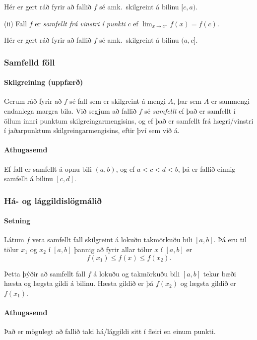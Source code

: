 \documentclass[icelandic,a4paper,12pt]{article}
\begin{document}
Hér er gert ráð fyrir að fallið $f$ sé amk.~skilgreint á bilinu
  $[c, a)$.

\pause
\medskip

\noindent
(ii)  Fall $f$ er {\em samfellt frá vinstri í punkti} $c$ ef
  $\lim_{x\rightarrow c^-}f(x)=f(c)$.
  
  Hér er gert ráð fyrir að fallið $f$ sé amk.~skilgreint á bilinu
  $(a, c]$.

 

\subsubsection*{Samfelld föll}
 \paragraph{Skilgreining (uppfærð)}
 Gerum ráð fyrir að $f$ sé fall sem er skilgreint á
 mengi $A$, þar sem $A$ er sammengi endanlega margra bila.
 Við segjum að fallið $f$ sé \emph{samfellt} ef það er samfellt í 
 öllum innri punktum skilgreingarmengisins, og ef það er samfellt
 frá hægri/vinstri í jaðarpunktum skilgreingarmengisins,
 eftir því sem við á.

\pause
\paragraph{Athugasemd}
	Ef fall er samfellt á opnu bili $(a,b)$, og ef 
	$a<c<d<b$, þá er fallið einnig samfellt á bilinu 
	$[c,d]$.
 


\subsubsection*{Há- og lággildislögmálið}
 \paragraph{Setning}
 Látum $f$ vera samfellt fall skilgreint á lokuðu takmörkuðu bili
  $[a,b]$.  Þá eru til tölur $x_1$ og $x_2$ í $[a,b]$ þannig að 
fyrir allar tölur $x$ í $[a,b]$ er
$$f(x_1)\leq f(x)\leq f(x_2).$$

\pause

Þetta þýðir að samfellt fall $f$ á lokuðu og takmörkuðu
bili $[a,b]$ tekur bæði hæsta og lægsta gildi á bilinu. \pause
Hæsta
gildið er þá $f(x_2)$ og lægsta gildið er $f(x_1)$.


\pause
 
\paragraph{Athugasemd}
 Það er mögulegt að fallið taki há/lággildi
 sitt í fleiri en einum punkti.
\end{document}
